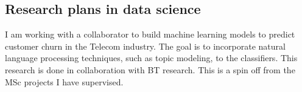 \subsection{Research plans in data science}

I am working with a collaborator to build machine learning
models to predict customer churn in the Telecom industry.
The goal is to incorporate natural language processing techniques,
such as topic modeling, to the classifiers.
This research is done in collaboration with BT research.
This is a spin off from the MSc projects I have supervised.
